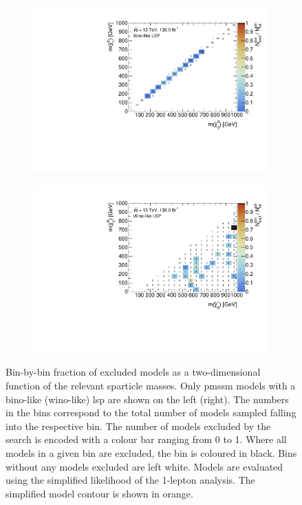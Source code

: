 \begin{figure}
	\begin{subfigure}[b]{0.5\linewidth}
		\centering\includegraphics[width=\textwidth]{cut_bino_LSP/mchi1p_mchi20_contour}
	\end{subfigure}\hfill
	\begin{subfigure}[b]{0.5\linewidth}
		\centering\includegraphics[width=\textwidth]{cut_wino_LSP/mchi10_mchi2p_contour}
	\end{subfigure}\hfill	
	
	\caption{Bin-by-bin fraction of excluded models as a two-dimensional function of the relevant sparticle masses. Only \gls{pmssm} models with a bino-like (wino-like) \gls{lsp} are shown on the left (right). The numbers in the bins correspond to the total number of models sampled falling into the respective bin. The number of models excluded by the \onelepton search is encoded with a colour bar ranging from 0 to 1. Where all models in a given bin are excluded, the bin is coloured in black. Bins without any models excluded are left white. Models are evaluated using the simplified likelihood of the 1-lepton analysis. The simplified model contour is shown in orange.}
	\label{fig:impact_electroweakinos_2D_bino_lsp}
\end{figure}

